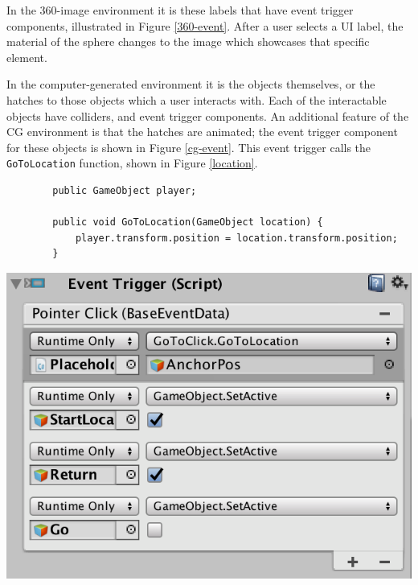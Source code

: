 \documentclass[ %
                    author={Elis Jones},
                supervisor={Dr. Kirsten Cater},
                    degree={BSc},
                     title={The Effect of Presentation Medium on Spatial Cognition},
                  subtitle={in the Virtual Environment},
                      year={2018} ]{dissertation}
\begin{document}
In the 360-image environment it is these labels that have event trigger components, illustrated in Figure \ref{360-event}. After a user selects a UI label, the material of the sphere changes to the image which showcases that specific element.

In the computer-generated environment it is the objects themselves, or the hatches to those objects which a user interacts with. Each of the interactable objects have colliders, and event trigger components. An additional feature of the CG environment is that the hatches are animated; the event trigger component for these objects is shown in Figure \ref{cg-event}. This event trigger calls the \lstinline{GoToLocation} function, shown in Figure \ref{location}. 

\begin{center}
    \centering
    \begin{minipage}{0.6\textwidth}
    \begin{lstlisting}
    	public GameObject player;
    
    	public void GoToLocation(GameObject location) {
    		player.transform.position = location.transform.position;
    	}
    \end{lstlisting}
    \label{location}
    \end{minipage}\hfill
    \begin{minipage}{0.35\textwidth}
        \centering
        \includegraphics[width=1\textwidth]{images/CG-event-component.png}
        \label{CG-event}
    \end{minipage}
\end{center}
\end{document}
